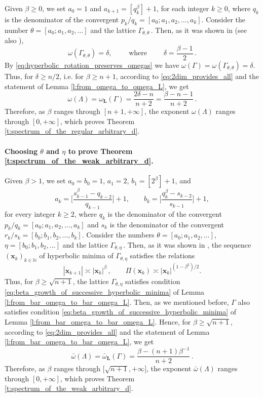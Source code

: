 \documentclass[a4paper,12pt]{article}
\theoremstyle{definition}
\theoremstyle{remark}
\theoremstyle{plain}
\renewcommand{\vec}[1]{\mathbf{#1}}
\renewcommand{\geq}{\geqslant}
\newcommand{\N}{\mathbb{N}}
\newcommand{\La}{\Lambda}
\newcommand{\Ga}{\Gamma}
\newcommand{\bL}{\mathbf{L}}
\begin{document}
Given $\beta\geq0$, we set $a_0=1$ and $a_{k+1}=[q_k^\beta]+1$, for each integer $k\geq0$, where $q_k$ is the denominator of the convergent $p_k/q_k=[a_0;a_1,a_2,\ldots,a_k]$. Consider the number $\theta=[a_0;a_1,a_2,\ldots]$ and the lattice $\Ga_{\theta,\theta}$\,. Then, as it was shown in \cite{german_sbornik_2026} (see also \cite{german_izv_2026}),
\[
  \omega(\Ga_{\theta,\theta})=\delta,
  \qquad\text{ where }\qquad
  \delta=\frac{\beta-1}2\,.
\]
By \eqref{eq:hyperbolic_rotation_preserves_omegas} we have $\omega(\Ga)=\omega(\Ga_{\theta,\theta})=\delta$. Thus, for $\delta\geq n/2$, i.e. for $\beta\geq n+1$, according to \eqref{eq:2dim_provides_all} and the statement of Lemma \ref{l:from_omega_to_omega_L}, we get
\[
  \omega(\La)=\omega_\bL(\Ga)=
  \dfrac{2\delta-n}{n+2}=
  \dfrac{\beta-n-1}{n+2}\,.
\]
Therefore, as $\beta$ ranges through $[n+1,+\infty]$, the exponent $\omega(\La)$ ranges through $[0,+\infty]$, which proves Theorem \ref{t:spectrum_of_the_regular_arbitrary_d}.


\paragraph{Choosing $\theta$ and $\eta$ to prove Theorem \ref{t:spectrum_of_the_weak_arbitrary_d}.}


Given $\beta>1$, we set $a_0=b_0=1$, $a_1=2$, $b_1=[2^\beta]+1$, and
\begin{equation}\label{eq:next_partial_qoutients_definition}
  a_k=\bigg[\frac{s_{k-1}^\beta-q_{k-2}}{q_{k-1}}\bigg]+1,
  \qquad
  b_k=\bigg[\frac{q_k^\beta-s_{k-2}}{s_{k-1}}\bigg]+1,
\end{equation}
for every integer $k\geq2$, where $q_k$ is the denominator of the convergent $p_k/q_k=[a_0;a_1,a_2,\ldots,a_k]$ and $s_k$ is the denominator of the convergent $r_k/s_k=[b_0;b_1,b_2,\ldots,b_k]$. Consider the numbers $\theta=[a_0;a_1,a_2,\ldots]$, $\eta=[b_0;b_1,b_2,\ldots]$ and the lattice $\Ga_{\theta,\eta}$\,. Then, as it was shown in \cite{german_sbornik_2026}, the sequence $(\vec x_k)_{k\in\N}$ of hyperbolic minima of $\Ga_{\theta,\eta}$ satisfies the relations
\[
  |\vec x_{k+1}|\asymp|\vec x_k|^\beta\,,
  \qquad
  \Pi(\vec x_k)\asymp|\vec x_k|^{(1-\beta^2)/2}.
\]
Thus, for $\beta\geq\sqrt{n+1}$, the lattice $\Ga_{\theta,\eta}$ satisfies condition \eqref{eq:beta_growth_of_successive_hyperbolic_minima} of Lemma \ref{l:from_bar_omega_to_bar_omega_L}. Then, as we mentioned before, $\Ga$ also satisfies condition \eqref{eq:beta_growth_of_successive_hyperbolic_minima} of Lemma \ref{l:from_bar_omega_to_bar_omega_L}. Hence, for $\beta\geq\sqrt{n+1}$, according to \eqref{eq:2dim_provides_all} and the statement of Lemma \ref{l:from_bar_omega_to_bar_omega_L}, we get
\[
  \bar\omega(\La)=\bar\omega_\bL(\Ga)=
  \dfrac{\beta-(n+1)\beta^{-1}}{n+2}\,.
\]
Therefore, as $\beta$ ranges through $\big[\sqrt{n+1},+\infty\big]$, the exponent $\bar\omega(\La)$ ranges through $[0,+\infty]$, which proves Theorem \ref{t:spectrum_of_the_weak_arbitrary_d}.
\end{document}
